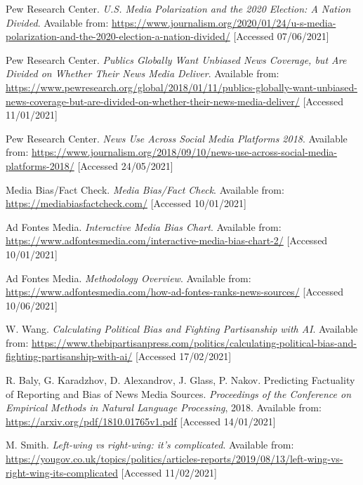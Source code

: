 \begin{thebibliography}{9}

Pew Research Center. \textit{U.S. Media Polarization and the 2020 Election: A Nation Divided}. 
Available from: \url{https://www.journalism.org/2020/01/24/u-s-media-polarization-and-the-2020-election-a-nation-divided/} [Accessed 07/06/2021]

Pew Research Center. \textit{Publics Globally Want Unbiased News Coverage, but Are Divided on Whether Their News Media Deliver}. Available from: \url{https://www.pewresearch.org/global/2018/01/11/publics-globally-want-unbiased-news-coverage-but-are-divided-on-whether-their-news-media-deliver/} [Accessed 11/01/2021]

Pew Research Center. \textit{News Use Across Social Media Platforms 2018}. Available from: \url{https://www.journalism.org/2018/09/10/news-use-across-social-media-platforms-2018/} [Accessed 24/05/2021]

Media Bias/Fact Check. \textit{Media Bias/Fact Check}. Available from: \url{https://mediabiasfactcheck.com/} [Accessed 10/01/2021]

Ad Fontes Media. \textit{Interactive Media Bias Chart}. Available from: \url{https://www.adfontesmedia.com/interactive-media-bias-chart-2/} [Accessed 10/01/2021]

Ad Fontes Media. \textit{Methodology Overview}. Available from: \url{https://www.adfontesmedia.com/how-ad-fontes-ranks-news-sources/} [Accessed 10/06/2021]

W. Wang. \textit{Calculating Political Bias and Fighting Partisanship with AI}. Available from: \url{https://www.thebipartisanpress.com/politics/calculating-political-bias-and-fighting-partisanship-with-ai/} [Accessed 17/02/2021]

R. Baly, G. Karadzhov, D. Alexandrov, J. Glass, P. Nakov. Predicting Factuality of Reporting and Bias of News Media Sources. \textit{Proceedings of the Conference on Empirical Methods in Natural Language Processing}, 2018. Available from: \url{https://arxiv.org/pdf/1810.01765v1.pdf} [Accessed 14/01/2021]

M. Smith. \textit{Left-wing vs right-wing: it’s complicated}. Available from: 
\url{https://yougov.co.uk/topics/politics/articles-reports/2019/08/13/left-wing-vs-right-wing-its-complicated} [Accessed 11/02/2021]


\end{thebibliography}
